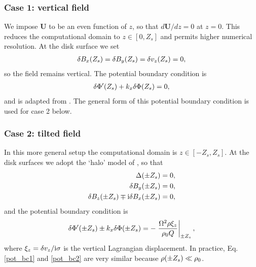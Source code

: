 \subsubsection{Case 1: vertical field}%
We impose $\bm{U}$ to be an even function of $z$, so that
$d\bm{U}/dz=0$ at $z=0$. This reduces the computational domain to
$z\in[0,Z_s]$ and permits higher numerical resolution. At the disk
surface we set %
\begin{align}
  \delta B_x(Z_s) = \delta B_y(Z_s) = \delta v_z (Z_s) = 0, 
\end{align}
so the field remains vertical. The potential boundary
condition is 
\begin{align}
  \delta \Phi^\prime(Z_s) + k_x\delta \Phi(Z_s) = 0 \label{pot_bc1},
\end{align}
and is adapted from \cite{goldreich65a}. The general form of this
potential boundary condition is used for case 2 below. 

\subsubsection{Case 2: tilted field} 
In this more general setup the computational domain is
$z\in[-Z_s, Z_s]$. At the disk surfaces we adopt the `halo' model of
\cite{gammie94}, so that
\begin{align}
  \Delta(\pm Z_s) & = 0, \\
  \delta B_y(\pm Z_s) & = 0,\\
  \delta B_z(\pm Z_s) \mp \mathrm{i} \delta B_x(\pm Z_s) &= 0,
\end{align}
and the potential boundary condition is 
\begin{align}
  \delta \Phi^\prime(\pm Z_s) \pm k_x\delta \Phi(\pm Z_s) =  - \left. \frac{\Omega^2
    \rho \xi_z}{\rho_0Q}\right|_{\pm Z_s}, \label{pot_bc2}
\end{align}
where $\xi_z=\delta v_z/\mathrm{i}\sigma$ is the vertical Lagrangian
displacement. In practice,  Eq. \ref{pot_bc1} and \ref{pot_bc2} are
very similar because $\rho(\pm Z_s)\ll\rho_0$. 



